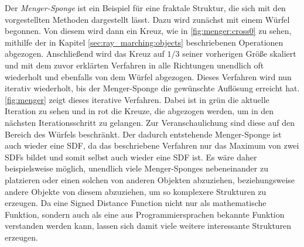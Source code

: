 Der \textit{Menger-Sponge} ist ein Beispiel für eine fraktale Struktur, die sich mit den vorgestellten Methoden dargestellt lässt.
Dazu wird zunächst mit einem Würfel begonnen.
Von diesem wird dann ein Kreuz, wie in \autoref{fig:menger:cross0} zu sehen, mithilfe der in Kapitel \ref{sec:ray_marching:objects} beschriebenen Operationen abgezogen.
Anschließend wird das Kreuz auf $1/3$ seiner vorherigen Größe skaliert und mit dem zuvor erklärten Verfahren in alle Richtungen unendlich oft wiederholt und ebenfalls von dem Würfel abgezogen.
Dieses Verfahren wird nun iterativ wiederholt, bis der Menger-Sponge die gewünschte Auflösung erreicht hat.
\autoref{fig:menger} zeigt dieses iterative Verfahren.
Dabei ist in grün die aktuelle Iteration zu sehen und in rot die Kreuze, die abgezogen werden, um in den nächsten Iterationsschritt zu gelangen.
Zur Veranschaulichung sind diese auf den Bereich des Würfels beschränkt.
Der dadurch entstehende Menger-Sponge ist auch wieder eine SDF, da das beschriebene Verfahren nur das Maximum von zwei SDFs bildet und somit selbst auch wieder eine SDF ist.
Es wäre daher beispielsweise möglich, unendlich viele Menger-Sponges nebeneinander zu platzieren oder einen solchen von anderen Objekten abzuziehen, beziehungsweise andere Objekte von diesem abzuziehen, um so komplexere Strukturen zu erzeugen.
Da eine Signed Distance Function nicht nur als mathematische Funktion, sondern auch als eine aus Programmiersprachen bekannte Funktion verstanden werden kann, lassen sich damit viele weitere interessante Strukturen erzeugen.

